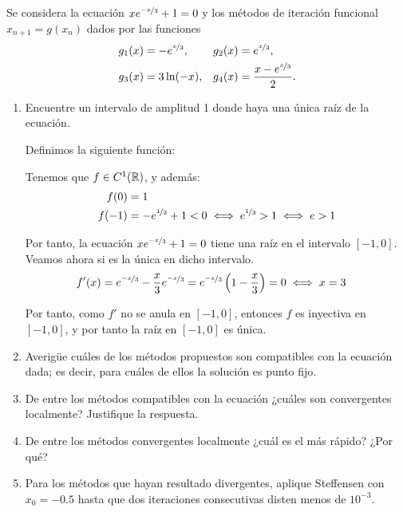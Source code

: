 \begin{ejercicio}\label{ej:1.1.13}
    Se considera la ecuación $xe^{\nicefrac{-x}{3}} + 1 = 0$ y los métodos de iteración funcional $x_{n+1} = g(x_n)$ dados por las funciones
    \begin{align*}
        g_1(x) &= -e^{\nicefrac{x}{3}}, & g_2(x) &= e^{\nicefrac{x}{3}}, \\
        g_3(x) &= 3\ln(-x), & g_4(x) &= \dfrac{x-e^{\nicefrac{x}{3}}}{2}.
    \end{align*}
    \begin{enumerate}
        \item Encuentre un intervalo de amplitud 1 donde haya una única raíz de la ecuación.
        
        Definimos la siguiente función:

        Tenemos que $f\in C^1(\mathbb{R})$, y además:
        \begin{align*}
            f(0)&=1\\
            f(-1)&=-e^{\nicefrac{1}{3}}+1<0\iff e^{\nicefrac{1}{3}}>1\iff e>1\\
        \end{align*}

        Por tanto, la ecuación $xe^{\nicefrac{-x}{3}} + 1 = 0$ tiene una raíz en el intervalo $[-1,0]$. Veamos ahora si es la única en dicho intervalo.
        \begin{align*}
            f'(x)&=e^{\nicefrac{-x}{3}}-\dfrac{x}{3}e^{\nicefrac{-x}{3}}=e^{\nicefrac{-x}{3}}\left(1-\dfrac{x}{3}\right)=0\iff x=3
        \end{align*}

        Por tanto, como $f'$ no se anula en $[-1,0]$, entonces $f$ es inyectiva en $[-1,0]$, y por tanto la raíz en $[-1,0]$ es única.
        \item Averigüe cuáles de los métodos propuestos son compatibles con la ecuación dada; es decir, para cuáles de ellos la solución es punto fijo.
        \item De entre los métodos compatibles con la ecuación ¿cuáles son convergentes localmente? Justifique la respuesta.
        \item De entre los métodos convergentes localmente ¿cuál es el más rápido? ¿Por qué?
        \item Para los métodos que hayan resultado divergentes, aplique Steffensen con $x_0 = -0.5$ hasta que dos iteraciones consecutivas disten menos de $10^{-3}$.
    \end{enumerate}
\end{ejercicio}


